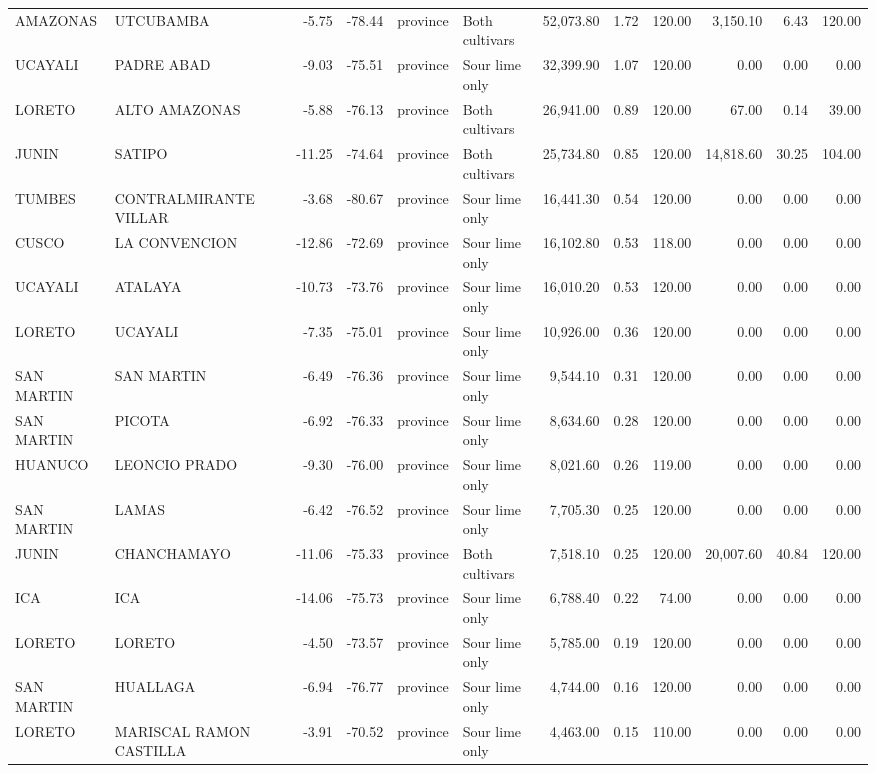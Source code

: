 \begin{longtable}{llrrllrrrrrr}
AMAZONAS & UTCUBAMBA & -5.75 & -78.44 & province & Both cultivars & 52,073.80 & 1.72 & 120.00 & 3,150.10 & 6.43 & 120.00 \\
UCAYALI & PADRE ABAD & -9.03 & -75.51 & province & Sour lime only & 32,399.90 & 1.07 & 120.00 & 0.00 & 0.00 & 0.00 \\
LORETO & ALTO AMAZONAS & -5.88 & -76.13 & province & Both cultivars & 26,941.00 & 0.89 & 120.00 & 67.00 & 0.14 & 39.00 \\
JUNIN & SATIPO & -11.25 & -74.64 & province & Both cultivars & 25,734.80 & 0.85 & 120.00 & 14,818.60 & 30.25 & 104.00 \\
TUMBES & CONTRALMIRANTE VILLAR & -3.68 & -80.67 & province & Sour lime only & 16,441.30 & 0.54 & 120.00 & 0.00 & 0.00 & 0.00 \\
CUSCO & LA CONVENCION & -12.86 & -72.69 & province & Sour lime only & 16,102.80 & 0.53 & 118.00 & 0.00 & 0.00 & 0.00 \\
UCAYALI & ATALAYA & -10.73 & -73.76 & province & Sour lime only & 16,010.20 & 0.53 & 120.00 & 0.00 & 0.00 & 0.00 \\
LORETO & UCAYALI & -7.35 & -75.01 & province & Sour lime only & 10,926.00 & 0.36 & 120.00 & 0.00 & 0.00 & 0.00 \\
SAN MARTIN & SAN MARTIN & -6.49 & -76.36 & province & Sour lime only & 9,544.10 & 0.31 & 120.00 & 0.00 & 0.00 & 0.00 \\
SAN MARTIN & PICOTA & -6.92 & -76.33 & province & Sour lime only & 8,634.60 & 0.28 & 120.00 & 0.00 & 0.00 & 0.00 \\
HUANUCO & LEONCIO PRADO & -9.30 & -76.00 & province & Sour lime only & 8,021.60 & 0.26 & 119.00 & 0.00 & 0.00 & 0.00 \\
SAN MARTIN & LAMAS & -6.42 & -76.52 & province & Sour lime only & 7,705.30 & 0.25 & 120.00 & 0.00 & 0.00 & 0.00 \\
JUNIN & CHANCHAMAYO & -11.06 & -75.33 & province & Both cultivars & 7,518.10 & 0.25 & 120.00 & 20,007.60 & 40.84 & 120.00 \\
ICA & ICA & -14.06 & -75.73 & province & Sour lime only & 6,788.40 & 0.22 & 74.00 & 0.00 & 0.00 & 0.00 \\
LORETO & LORETO & -4.50 & -73.57 & province & Sour lime only & 5,785.00 & 0.19 & 120.00 & 0.00 & 0.00 & 0.00 \\
SAN MARTIN & HUALLAGA & -6.94 & -76.77 & province & Sour lime only & 4,744.00 & 0.16 & 120.00 & 0.00 & 0.00 & 0.00 \\
LORETO & MARISCAL RAMON CASTILLA & -3.91 & -70.52 & province & Sour lime only & 4,463.00 & 0.15 & 110.00 & 0.00 & 0.00 & 0.00 \\

\end{longtable}
